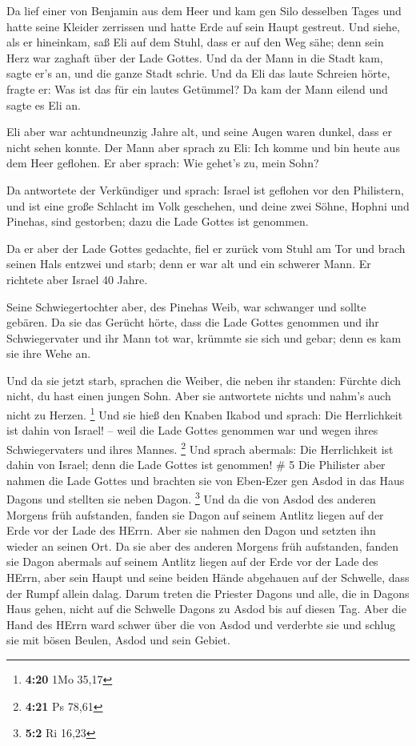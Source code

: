  Da lief einer von Benjamin aus dem Heer und kam gen Silo
desselben Tages und hatte seine Kleider zerrissen und hatte Erde auf
sein Haupt gestreut.  Und siehe, als er hineinkam, saß Eli
auf dem Stuhl, dass er auf den Weg sähe; denn sein Herz war zaghaft über
der Lade Gottes. Und da der Mann in die Stadt kam, sagte er's an, und
die ganze Stadt schrie.  Und da Eli das laute Schreien
hörte, fragte er: Was ist das für ein lautes Getümmel? Da kam der Mann
eilend und sagte es Eli an.

 Eli aber war achtundneunzig Jahre alt, und seine Augen
waren dunkel, dass er nicht sehen konnte.  Der Mann aber
sprach zu Eli: Ich komme und bin heute aus dem Heer geflohen. Er aber
sprach: Wie gehet's zu, mein Sohn?

 Da antwortete der Verkündiger und sprach: Israel ist
geflohen vor den Philistern, und ist eine große Schlacht im Volk
geschehen, und deine zwei Söhne, Hophni und Pinehas, sind gestorben;
dazu die Lade Gottes ist genommen.

 Da er aber der Lade Gottes gedachte, fiel er zurück vom
Stuhl am Tor und brach seinen Hals entzwei und starb; denn er war alt
und ein schwerer Mann. Er richtete aber Israel 40 Jahre.

 Seine Schwiegertochter aber, des Pinehas Weib, war
schwanger und sollte gebären. Da sie das Gerücht hörte, dass die Lade
Gottes genommen und ihr Schwiegervater und ihr Mann tot war, krümmte sie
sich und gebar; denn es kam sie ihre Wehe an.

 Und da sie jetzt starb, sprachen die Weiber, die neben ihr
standen: Fürchte dich nicht, du hast einen jungen Sohn. Aber sie
antwortete nichts und nahm's auch nicht zu Herzen. \footnote{\textbf{4:20}
  1Mo 35,17}  Und sie hieß den Knaben Ikabod und sprach:
Die Herrlichkeit ist dahin von Israel! -- weil die Lade Gottes genommen
war und wegen ihres Schwiegervaters und ihres Mannes. \footnote{\textbf{4:21}
  Ps 78,61}  Und sprach abermals: Die Herrlichkeit ist
dahin von Israel; denn die Lade Gottes ist genommen! \# 5 
Die Philister aber nahmen die Lade Gottes und brachten sie von Eben-Ezer
gen Asdod  in das Haus Dagons und stellten sie neben Dagon.
\footnote{\textbf{5:2} Ri 16,23}  Und da die von Asdod des
anderen Morgens früh aufstanden, fanden sie Dagon auf seinem Antlitz
liegen auf der Erde vor der Lade des HErrn. Aber sie nahmen den Dagon
und setzten ihn wieder an seinen Ort.  Da sie aber des
anderen Morgens früh aufstanden, fanden sie Dagon abermals auf seinem
Antlitz liegen auf der Erde vor der Lade des HErrn, aber sein Haupt und
seine beiden Hände abgehauen auf der Schwelle, dass der Rumpf allein
dalag.  Darum treten die Priester Dagons und alle, die in
Dagons Haus gehen, nicht auf die Schwelle Dagons zu Asdod bis auf diesen
Tag.  Aber die Hand des HErrn ward schwer über die von Asdod
und verderbte sie und schlug sie mit bösen Beulen, Asdod und sein
Gebiet.

